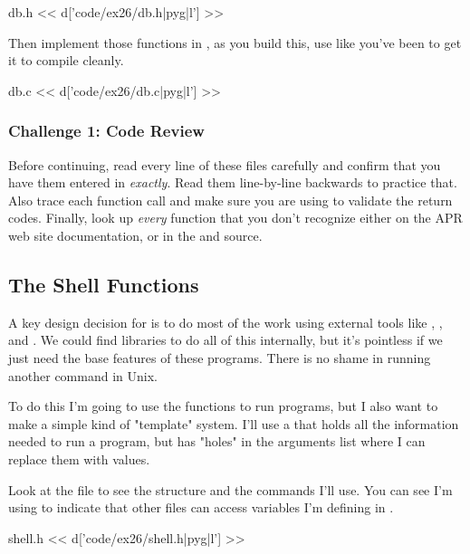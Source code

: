 \begin{code}{db.h}
<< d['code/ex26/db.h|pyg|l'] >>
\end{code}

Then implement those functions in , as you build this, use
 like you've been to get it to compile cleanly.

\begin{code}{db.c}
<< d['code/ex26/db.c|pyg|l'] >>
\end{code}

\subsubsection{Challenge 1: Code Review}

Before continuing, read every line of these files carefully and 
confirm that you have them entered in \emph{exactly}.  Read them
line-by-line backwards to practice that. Also trace each function 
call and make sure you are using  to validate the
return codes.  Finally, look up \emph{every} function that you
don't recognize either on the APR web site documentation, or
in the  and  source.


\subsection{The Shell Functions}

A key design decision for  is to do most of the work
using external tools like , , and .
We could find libraries to do all of this internally, but it's pointless
if we just need the base features of these programs.  There is no shame
in running another command in Unix.

To do this I'm going to use the  functions
to run programs, but I also want to make a simple kind of "template"
system.  I'll use a  that holds all the information
needed to run a program, but has "holes" in the arguments list where I
can replace them with values.

Look at the  file to see the structure and the commands I'll use.
You can see I'm using  to indicate that other  files
can access variables I'm defining in .

\begin{code}{shell.h}
<< d['code/ex26/shell.h|pyg|l'] >>
\end{code}

